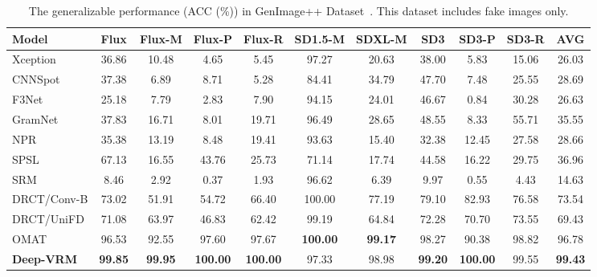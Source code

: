 \documentclass{article}
\theoremstyle{plain}
\theoremstyle{definition}
\theoremstyle{remark}
\begin{document}
\begin{table}[t]
\centering
  \scriptsize
\caption{The generalizable performance (ACC (\%)) in GenImage++ Dataset~\citep{zhou2025breaking}. This dataset includes fake images only.} 
\setlength{\tabcolsep}{10pt}
\begin{tabular}{l|ccccccccc|c}
\toprule
Model & Flux & Flux-M & Flux-P & Flux-R & SD1.5-M & SDXL-M & SD3 & SD3-P & SD3-R & \textbf{AVG} \\
\midrule
Xception  & 36.86 & 10.48 & 4.65  & 5.45  & 97.27 & 20.63 & 38.00 & 5.83  & 15.06 & 26.03 \\
CNNSpot   & 37.38 & 6.89  & 8.71  & 5.28  & 84.41 & 34.79 & 47.70 & 7.48  & 25.55 & 28.69 \\
F3Net     & 25.18 & 7.79 & 2.83 & 7.90 & 94.15 & 24.01 & 46.67 & 0.84 & 30.28 & 26.63 \\
GramNet   & 37.83 & 16.71 & 8.01  & 19.71 & 96.49 & 28.65 & 48.55 & 8.33  & 55.71 & 35.55 \\
NPR       & 35.38 & 13.19 & 8.48  & 19.41 & 93.63 & 15.40 & 32.38 & 12.45 & 27.58 & 28.66 \\
SPSL      & 67.13 & 16.55 & 43.76 & 25.73 & 71.14 & 17.74 & 44.58 & 16.22 & 29.75 & 36.96 \\
SRM       & 8.46  & 2.92  & 0.37  & 1.93  & 96.62 & 6.39  & 9.97  & 0.55  & 4.43  & 14.63 \\
DRCT/Conv-B & 73.02 & 51.91 & 54.72 & 66.40 & 100.00 & 77.19 & 79.10 & 82.93 & 76.58 & 73.54\\
DRCT/UniFD & 71.08 & 63.97 & 46.83 & 62.42 & 99.19 & 64.84 & 72.28 & 70.70 & 73.55 & 69.43 \\
OMAT & {96.53} & {92.55} & {97.60} & {97.67} & \textbf{100.00} & \textbf{99.17} &{98.27} & {90.38} & {98.82} & {96.78} \\
\midrule
\rowcolor{blue!3} \textbf{Deep-VRM} &\textbf{99.85} &\textbf{99.95} &\textbf{100.00} &\textbf{100.00} &97.33 &{98.98} &\textbf{99.20} &\textbf{100.00} &{99.55} &\textbf{99.43} \\
\bottomrule
\end{tabular}
\label{tab:genimage++}
\end{table}
\end{document}

